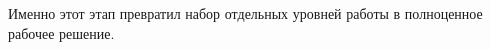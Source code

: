 Именно этот этап превратил набор отдельных уровней работы в полноценное рабочее решение.
%
%
%
%
%
%

%
%


